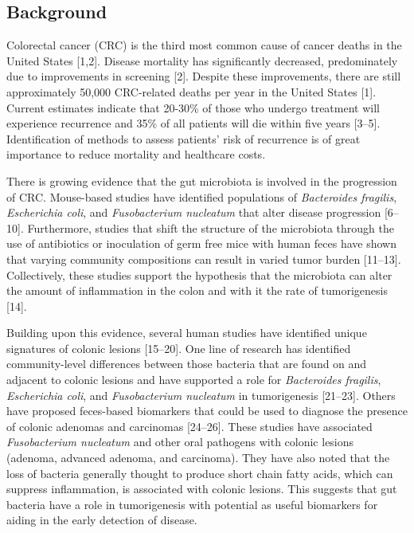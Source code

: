 \documentclass[12pt,]{article}
\begin{document}
\newpage

\linenumbers

\subsection{Background}\label{background}

Colorectal cancer (CRC) is the third most common cause of cancer deaths
in the United States {[}1,2{]}. Disease mortality has significantly
decreased, predominately due to improvements in screening {[}2{]}.
Despite these improvements, there are still approximately 50,000
CRC-related deaths per year in the United States {[}1{]}. Current
estimates indicate that 20-30\% of those who undergo treatment will
experience recurrence and 35\% of all patients will die within five
years {[}3--5{]}. Identification of methods to assess patients' risk of
recurrence is of great importance to reduce mortality and healthcare
costs.

There is growing evidence that the gut microbiota is involved in the
progression of CRC. Mouse-based studies have identified populations of
\emph{Bacteroides fragilis}, \emph{Escherichia coli}, and
\emph{Fusobacterium nucleatum} that alter disease progression
{[}6--10{]}. Furthermore, studies that shift the structure of the
microbiota through the use of antibiotics or inoculation of germ free
mice with human feces have shown that varying community compositions can
result in varied tumor burden {[}11--13{]}. Collectively, these studies
support the hypothesis that the microbiota can alter the amount of
inflammation in the colon and with it the rate of tumorigenesis
{[}14{]}.

Building upon this evidence, several human studies have identified
unique signatures of colonic lesions {[}15--20{]}. One line of research
has identified community-level differences between those bacteria that
are found on and adjacent to colonic lesions and have supported a role
for \emph{Bacteroides fragilis}, \emph{Escherichia coli}, and
\emph{Fusobacterium nucleatum} in tumorigenesis {[}21--23{]}. Others
have proposed feces-based biomarkers that could be used to diagnose the
presence of colonic adenomas and carcinomas {[}24--26{]}. These studies
have associated \emph{Fusobacterium nucleatum} and other oral pathogens
with colonic lesions (adenoma, advanced adenoma, and carcinoma). They
have also noted that the loss of bacteria generally thought to produce
short chain fatty acids, which can suppress inflammation, is associated
with colonic lesions. This suggests that gut bacteria have a role in
tumorigenesis with potential as useful biomarkers for aiding in the
early detection of disease.
\end{document}

